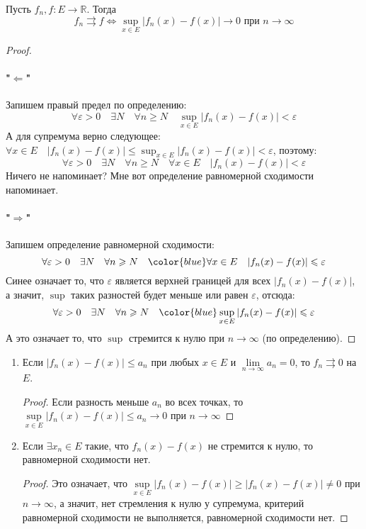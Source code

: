 \begin{theorem} \thmslashn

  Пусть $f_n, f \colon E \to \mathbb{R}$. Тогда
  $$f_n \rightrightarrows f \Leftrightarrow \sup_{x\in E}|f_n(x) - f(x)| \rightarrow 0 \text{ при } n\to \infty$$
  \begin{proof} \thmslashn

    \paragraph{"$\Leftarrow$"} Запишем правый предел по определению:
    $$\forall\varepsilon>0\quad\exists N\quad\forall n \geqslant N\quad \sup_{x\in E}|f_n(x) - f(x)| < \varepsilon$$
    А для супремума верно следующее: $\forall x\in E \quad |f_n(x) - f(x)|\leqslant\sup_{x\in E}|f_n(x) - f(x)|<\varepsilon$, поэтому:
    $$\forall\varepsilon>0\quad\exists N\quad\forall n \geqslant N\quad \forall x\in E \quad |f_n(x) - f(x)|<\varepsilon$$
    Ничего не напоминает? Мне вот определение равномерной сходимости напоминает.
    \paragraph{"$\Rightarrow$"} Запишем определение равномерной сходимости:
    $$\forall \varepsilon > 0 \quad \exists N \quad \forall n \geqslant N\quad {\color{blue}\forall x \in E\quad |f_n(x) - f(x)|\leqslant \varepsilon}$$
    Синее означает то, что $\varepsilon$ является верхней границей для всех $|f_n(x) - f(x)|$, а значит, $\sup$ таких разностей будет меньше или равен $\varepsilon$, отсюда:
    $$\forall \varepsilon > 0 \quad \exists N \quad \forall n \geqslant N\quad {\color{blue}\sup_{x\in E}|f_n(x) - f(x)|\leqslant \varepsilon}$$
    А это означает то, что $\sup$ стремится к нулю при $n\rightarrow\infty$ (по определению).
  \end{proof}
\end{theorem}
\begin{consequence} \thmslashn

  \begin{enumerate}
  \item Если $|f_n(x) - f(x)| \leq a_n$ при любых $x\in E$ и $\lim\limits_{n\rightarrow\infty}a_n = 0$, то $f_n\rightrightarrows 0$ на $E$.
    \begin{proof} \thmslashn

      Если разность меньше $a_n$ во всех точках, то $\sup\limits_{x\in E}|f_n(x) - f(x)| \leqslant a_n\to 0$ при $n\to\infty$
    \end{proof}
  \item Если $\exists x_n\in E$ такие, что $f_n(x) - f(x)$ не стремится к нулю, то равномерной сходимости нет.  
    \begin{proof} \thmslashn

      Это означает, что $\sup\limits_{x\in E}|f_n(x) - f(x)| \geqslant |f_n(x) - f(x)| \neq 0$ при $n\rightarrow\infty$, а значит, нет стремления к нулю у супремума, критерий равномерной сходимости не выполняется, равномерной сходимости нет.
    \end{proof}
  \end{enumerate}
\end{consequence}
